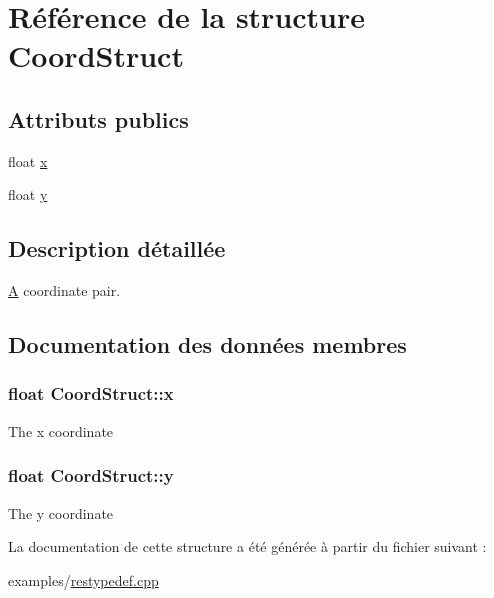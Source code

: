 \hypertarget{struct_coord_struct}{}\section{Référence de la structure Coord\+Struct}
\label{struct_coord_struct}
\subsection*{Attributs publics}
\begin{DoxyCompactItemize}
\item 
float \hyperlink{struct_coord_struct_a183d7226fc5a8470ce9b9f04f9cb69bb}{x}
\item 
float \hyperlink{struct_coord_struct_a1a5966a881bc3e76e9becf00639585ac}{y}
\end{DoxyCompactItemize}


\subsection{Description détaillée}
\hyperlink{class_a}{A} coordinate pair. 

\subsection{Documentation des données membres}
\hypertarget{struct_coord_struct_a183d7226fc5a8470ce9b9f04f9cb69bb}{}
\subsubsection[{x}]{\setlength{\rightskip}{0pt plus 5cm}float Coord\+Struct\+::x}\label{struct_coord_struct_a183d7226fc5a8470ce9b9f04f9cb69bb}
The x coordinate \hypertarget{struct_coord_struct_a1a5966a881bc3e76e9becf00639585ac}{}
\subsubsection[{y}]{\setlength{\rightskip}{0pt plus 5cm}float Coord\+Struct\+::y}\label{struct_coord_struct_a1a5966a881bc3e76e9becf00639585ac}
The y coordinate 

La documentation de cette structure a été générée à partir du fichier suivant \+:\begin{DoxyCompactItemize}
\item 
examples/\hyperlink{restypedef_8cpp}{restypedef.\+cpp}\end{DoxyCompactItemize}

